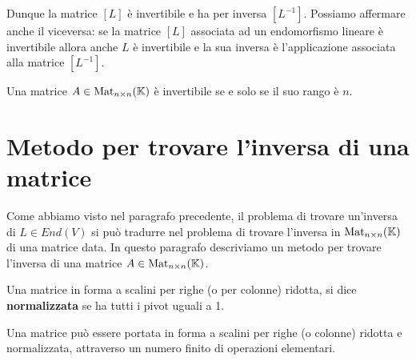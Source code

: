 Dunque la matrice $[L]$ è invertibile e ha per inversa $[L^{-1}]$.
Possiamo affermare anche il viceversa: se la matrice $[L]$ associata ad un
endomorfismo lineare è invertibile allora anche $L$ è invertibile e la sua
inversa è l'applicazione associata alla matrice $[L^{-1}]$.

\begin{corollary}
	Una matrice $A \in \operatorname{Mat}_{n \times n}(\mathbb{K})$ è invertibile se e solo se
	il suo rango è $n$.
\end{corollary}

\section{Metodo per trovare l'inversa di una matrice}
Come abbiamo visto nel paragrafo precedente, il problema di trovare un'inversa
di $L \in End(V)$ si può tradurre nel problema di trovare l'inversa in
$\operatorname{Mat}_{n \times n}(\mathbb{K})$ di una matrice data. In questo paragrafo descriviamo
un metodo per trovare l'inversa di una matrice $A \in \operatorname{Mat}_{n \times n}(\mathbb{K})$.

\begin{definition}
	Una matrice in forma a scalini per righe (o per colonne) ridotta, si dice
	\textbf{normalizzata} se ha tutti i pivot uguali a 1.
\end{definition}

\begin{observation}
	Una matrice può essere portata in forma a scalini per righe (o colonne)
	ridotta e normalizzata, attraverso un numero finito di operazioni elementari.
\end{observation}


